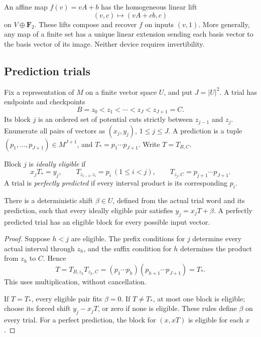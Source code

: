 An affine map \(f(v)=vA+b\) has the homogeneous linear lift
\begin{equation}\label{eq:homogeneous}
            (v,c)\longmapsto(vA+cb,c)
\end{equation}
on \(V\oplus\mathbf F_2\). These lifts compose and recover \(f\) on inputs
\((v,1)\). More generally, any map of a finite set has a unique linear
extension sending each basis vector to the basis vector of its image.
Neither device requires invertibility.

\subsection{Prediction trials}

Fix a representation of \(M\) on a finite vector space \(U\), and put
\(J=|U|^2\). A trial has endpoints and checkpoints
\[
                 B=z_0<z_1<\cdots<z_J<z_{J+1}=C.
\]
Its block \(j\) is an ordered set of potential cuts strictly between
\(z_{j-1}\) and \(z_j\). Enumerate all pairs of vectors as
\((x_j,y_j)\), \(1\le j\le J\). A prediction is a tuple
\((p_1,\ldots,p_{J+1})\in M^{J+1}\), and \(T_*=p_1\cdots p_{J+1}\).
Write \(T=T_{B,C}\).

\begin{definition}\label{def:eligibility}
Block \(j\) is \emph{ideally eligible} if
\[
 x_jT_*=y_j,\qquad
 T_{z_{i-1},z_i}=p_i\ (1\le i<j),\qquad
 T_{z_j,C}=p_{j+1}\cdots p_{J+1}.
\]
A trial is \emph{perfectly predicted} if every interval product is its
corresponding \(p_i\).
\end{definition}

\begin{lemma}\label{lem:prediction}
There is a deterministic shift \(\beta\in U\), defined from the actual trial
word and its prediction, such that every ideally eligible pair satisfies
\(y_j=x_jT+\beta\). A perfectly predicted trial has an eligible block for
every possible input vector.
\end{lemma}

\begin{proof}
Suppose \(h<j\) are eligible. The prefix conditions for \(j\) determine every
actual interval through \(z_h\), and the suffix condition for \(h\) determines
the product from \(z_h\) to \(C\). Hence
\[
 T=T_{B,z_h}T_{z_h,C}
  =(p_1\cdots p_h)(p_{h+1}\cdots p_{J+1})=T_*.
\]
This uses multiplication, without cancellation.

If \(T=T_*\), every eligible pair fits \(\beta=0\). If \(T\ne T_*\), at most
one block is eligible; choose its forced shift \(y_j-x_jT\), or zero if none
is eligible. These rules define \(\beta\) on every trial.
For a perfect prediction, the block for \((x,xT)\) is eligible for each \(x\).
\end{proof}

